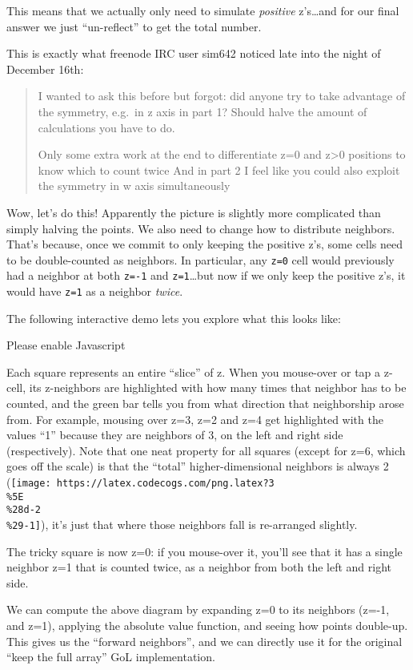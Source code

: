 \documentclass[]{article}
\begin{document}
This means that we actually only need to simulate \emph{positive} z's\ldots and
for our final answer we just ``un-reflect'' to get the total number.

This is exactly what freenode IRC user sim642 noticed late into the night of
December 16th:

\begin{quote}
I wanted to ask this before but forgot: did anyone try to take advantage of the
symmetry, e.g.~in z axis in part 1? Should halve the amount of calculations you
have to do.

Only some extra work at the end to differentiate z=0 and z\textgreater0
positions to know which to count twice And in part 2 I feel like you could also
exploit the symmetry in w axis simultaneously
\end{quote}

Wow, let's do this! Apparently the picture is slightly more complicated than
simply halving the points. We also need to change how to distribute neighbors.
That's because, once we commit to only keeping the positive z's, some cells need
to be double-counted as neighbors. In particular, any \texttt{z=0} cell would
previously had a neighbor at both \texttt{z=-1} and \texttt{z=1}\ldots but now
if we only keep the positive z's, it would have \texttt{z=1} as a neighbor
\emph{twice}.

The following interactive demo lets you explore what this looks like:

\leavevmode\hypertarget{golSyms3DForward}{}%
Please enable Javascript

Each square represents an entire ``slice'' of z. When you mouse-over or tap a
z-cell, its z-neighbors are highlighted with how many times that neighbor has to
be counted, and the green bar tells you from what direction that neighborship
arose from. For example, mousing over z=3, z=2 and z=4 get highlighted with the
values ``1'' because they are neighbors of 3, on the left and right side
(respectively). Note that one neat property for all squares (except for z=6,
which goes off the scale) is that the ``total'' higher-dimensional neighbors is
always 2
(\texttt{[image: https://latex.codecogs.com/png.latex?3\\\%5E\\\%28d-2\\\%29-1]}),
it's just that where those neighbors fall is re-arranged slightly.

The tricky square is now z=0: if you mouse-over it, you'll see that it has a
single neighbor z=1 that is counted twice, as a neighbor from both the left and
right side.

We can compute the above diagram by expanding z=0 to its neighbors (z=-1, and
z=1), applying the absolute value function, and seeing how points double-up.
This gives us the ``forward neighbors'', and we can directly use it for the
original ``keep the full array'' GoL implementation.
\end{document}
